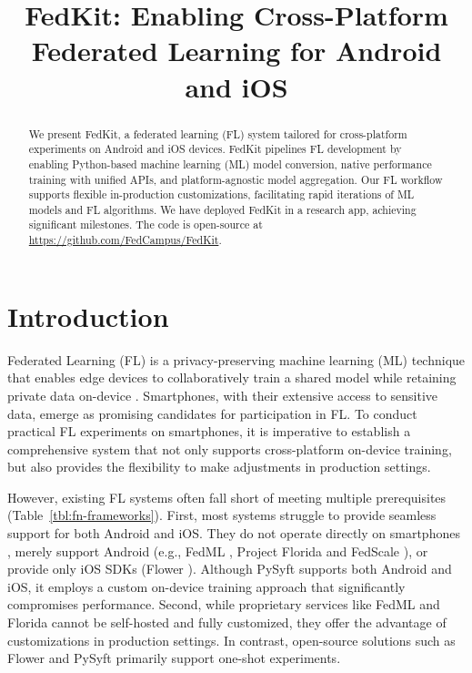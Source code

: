 \documentclass[letterpaper]{article} %
\title{FedKit: Enabling Cross-Platform Federated Learning for Android and iOS}
\author{}
\begin{document}
\maketitle

\begin{abstract}
    We present FedKit, a federated learning (FL) system tailored for
    cross-platform experiments on Android and iOS devices.
    FedKit pipelines FL development by
    enabling Python-based machine learning (ML) model conversion,
    native performance training with unified APIs,
    and platform-agnostic model aggregation.
    Our FL workflow supports flexible in-production customizations,
    facilitating rapid iterations of ML models and FL algorithms.
    We have deployed FedKit in a research app,
    achieving significant milestones.
    The code is open-source at \url{https://github.com/FedCampus/FedKit}.
\end{abstract}

\section{Introduction}

Federated Learning (FL) 
is a privacy-preserving machine learning (ML) technique
that enables edge devices to collaboratively train a shared model while
retaining private data on-device \cite{mcmahan2017communication}.
Smartphones, with their extensive access to sensitive data,
emerge as promising candidates for participation in FL.
To conduct practical FL experiments on smartphones,
it is imperative to establish a comprehensive system that
not only supports cross-platform on-device training,
but also provides the flexibility to make adjustments in production settings.

However, existing FL systems often fall short of meeting multiple prerequisites
(Table~\ref{tbl:fn-frameworks}).
First, most systems struggle to provide seamless support for both Android and iOS.
They do not operate directly on smartphones
\cite[e.g.,][]{bonawitz2019towards,liu2021fate,ma2019paddlepaddle,openfl_citation},
merely support Android (e.g.,
FedML \cite{he2020fedml}, Project Florida \cite{madrigal2023project}
and FedScale \cite{lai2022fedscale}),
or provide only iOS SDKs (Flower \cite{beutel2020flower,mathur2021ondevice}).
Although PySyft \cite{ryffel2018generic,Ziller2021,hall2021syft} supports
both Android and iOS, it employs
a custom on-device training approach that significantly compromises performance.
Second, while proprietary services like FedML and Florida cannot
be self-hosted and fully customized,
they offer the advantage of customizations in production settings.
In contrast, open-source solutions such as Flower and PySyft primarily
support one-shot experiments.
\end{document}
